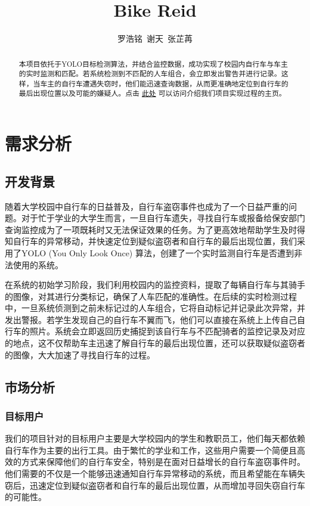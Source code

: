 \documentclass{article}
\title{Bike Reid}
\author{罗浩铭~谢天~张芷苒}
\begin{document}
\maketitle

\begin{abstract}
本项目依托于YOLO目标检测算法，并结合监控数据，成功实现了校园内自行车与车主的实时监测和匹配。若系统检测到不匹配的人车组合，会立即发出警告并进行记录。这样，当车主的自行车遭遇失窃时，他们能迅速查询数据，从而更准确地定位到自行车的最后出现位置以及可能的嫌疑人。点击 \href{https://4332001876.github.io/YOLO_Bicycle_Theft_Detection/}{此处} 可以访问介绍我们项目实现过程的主页。

\end{abstract}

\section{需求分析}
\subsection{开发背景}

随着大学校园中自行车的日益普及，自行车盗窃事件也成为了一个日益严重的问题。对于忙于学业的大学生而言，一旦自行车遗失，寻找自行车或报备给保安部门查询监控成为了一项既耗时又无法保证效果的任务。为了更高效地帮助学生及时得知自行车的异常移动，并快速定位到疑似盗窃者和自行车的最后出现位置，我们采用了YOLO (You Only Look Once) 算法，创建了一个实时监测自行车是否遭到非法使用的系统。

在系统的初始学习阶段，我们利用校园内的监控资料，提取了每辆自行车与其骑手的图像，对其进行分类标记，确保了人车匹配的准确性。在后续的实时检测过程中，一旦系统侦测到之前未标记过的人车组合，它将自动标记并记录此次异常，并发出警报。若学生发现自己的自行车不翼而飞，他们可以直接在系统上上传自己自行车的照片。系统会立即返回历史捕捉到该自行车与不匹配骑者的监控记录及对应的地点，这不仅帮助车主迅速了解自行车的最后出现位置，还可以获取疑似盗窃者的图像，大大加速了寻找自行车的过程。

\subsection{市场分析}
\subsubsection{目标用户}

我们的项目针对的目标用户主要是大学校园内的学生和教职员工，他们每天都依赖自行车作为主要的出行工具。由于繁忙的学业和工作，这些用户需要一个简便且高效的方式来保障他们的自行车安全，特别是在面对日益增长的自行车盗窃事件时。他们需要的不仅是一个能够迅速通知自行车异常移动的系统，而且希望能在车辆失窃后，迅速定位到疑似盗窃者和自行车的最后出现位置，从而增加寻回失窃自行车的可能性。
\end{document}

